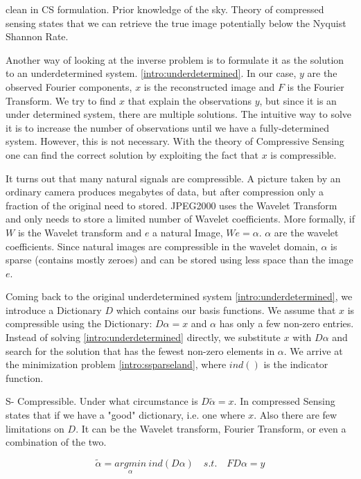clean in CS formulation. Prior knowledge of the sky. Theory of compressed sensing states that we can retrieve the true image potentially below the Nyquist Shannon Rate.

Another way of looking at the inverse problem is to formulate it as the solution to an underdetermined system. \eqref{intro:underdetermined}. In our case, $y$ are the observed Fourier components, $x$ is the reconstructed image and $F$ is the Fourier Transform. We try to find $x$ that explain the observations $y$, but since it is an under determined system, there are multiple solutions. The intuitive way to solve it is to increase the number of observations until we have a fully-determined system. However, this is not necessary. With the theory of Compressive Sensing one can find the correct solution by exploiting the fact that $x$ is compressible.

It turns out that many natural signals are compressible. A picture taken by an ordinary camera produces megabytes of data, but after compression only a fraction of the original need to stored. JPEG2000 uses the Wavelet Transform and only needs to store a limited number of Wavelet coefficients. More formally, if $W$ is the Wavelet transform and $e$ a natural Image, $We = \alpha$. $\alpha$ are the wavelet coefficients. Since natural images are compressible in the wavelet domain, $\alpha$ is sparse (contains mostly zeroes) and can be stored using less space than the image $e$.

Coming back to the original underdetermined system \eqref{intro:underdetermined}, we introduce a Dictionary $D$ which contains our basis functions. We assume that $x$ is compressible using the Dictionary: $D\alpha = x$ and $\alpha$ has only a few non-zero entries. Instead of solving \eqref{intro:underdetermined} directly, we substitute $x$ with $D\alpha$ and search for the solution that has the fewest non-zero elements in $\alpha$. We arrive at the minimization problem \eqref{intro:ssparseland}, where $\mathit{ind}()$ is the indicator function. 

S- Compressible. Under what circumstance is $D\tilde{\alpha} = x$. In compressed Sensing states that if we have a "good" dictionary, i.e. one where $x$. Also there are few limitations on $D$. It can be the Wavelet transform, Fourier Transform, or even a combination of the two.

\begin{equation}\label{intro:ssparseland}
\tilde{\alpha} =  \underset{\alpha}{arg min} \: \mathit{ind}(D\alpha) \quad s. t. \quad FD\alpha = y
\end{equation}

